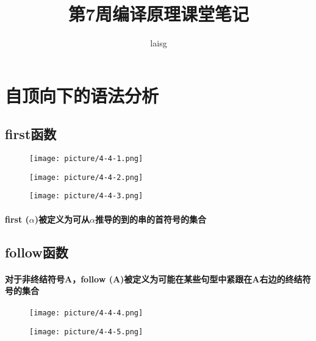 \documentclass[UTF8]{article}
\title{第7周编译原理课堂笔记}
\author{laisg}
\begin{document}
\maketitle
 \section{自顶向下的语法分析}%
 \label{sec:自顶向下的语法分析}
 \subsection{first函数}%
 \label{sub:first函数}
 \begin{figure}[]
   \centering
   \texttt{[image: picture/4-4-1.png]}
 \end{figure}

 \begin{figure}[]
   \centering
   \texttt{[image: picture/4-4-2.png]}
 \end{figure}

 \begin{figure}[]
   \centering
   \texttt{[image: picture/4-4-3.png]}
 \end{figure}
 \paragraph{first ($\alpha$)被定义为可从$\alpha$推导的到的串的首符号的集合}%
 \label{par:first_alpha_被定义为可从_alpha_推导的到的串的首符号的集合}
 
 
 \subsection{follow函数}%
 \label{sub:follow函数}
 \paragraph{对于非终结符号A，follow (A)被定义为可能在某些句型中紧跟在A右边的终结符号的集合}%
 \label{par:对于非终结符号a_follow_a_别定义为可能在某些句型中紧跟在a右边的终结符号的集合}
 
 \begin{figure}[]
   \centering
   \texttt{[image: picture/4-4-4.png]}
 \end{figure}

 \begin{figure}[]
   \centering
   \texttt{[image: picture/4-4-5.png]}
 \end{figure}
\end{document}
